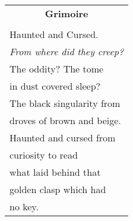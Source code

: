 \documentclass{article}
\begin{document}
\newcommand{\h}{\hspace*{4ex}}

\begin{center}
\begin{tabular}{l}
\multicolumn{1}{c}{\large\textbf{Grimoire}} \\
\\
Haunted and Cursed. \\
\textit{From where did they creep?} \\
The oddity? The tome \\
in dust covered sleep? \\
The black singularity from \\
droves of brown and beige. \\
Haunted and cursed from \\
curiosity to read \\
what laid behind that \\
golden clasp which had \\
no key. \\
\end{tabular}
\end{center}
\end{document}

